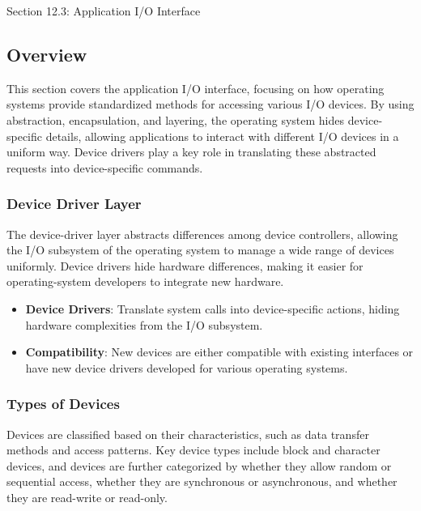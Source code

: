 \begin{notes}{Section 12.3: Application I/O Interface}
    \subsection*{Overview}

    This section covers the application I/O interface, focusing on how operating systems provide standardized methods for accessing various I/O devices. By using abstraction, encapsulation, and layering, 
    the operating system hides device-specific details, allowing applications to interact with different I/O devices in a uniform way. Device drivers play a key role in translating these abstracted 
    requests into device-specific commands.
    
    \subsubsection*{Device Driver Layer}
    
    The device-driver layer abstracts differences among device controllers, allowing the I/O subsystem of the operating system to manage a wide range of devices uniformly. Device drivers hide hardware 
    differences, making it easier for operating-system developers to integrate new hardware.
    
    \begin{highlight}
    
        \begin{itemize}
            \item \textbf{Device Drivers}: Translate system calls into device-specific actions, hiding hardware complexities from the I/O subsystem.
            \item \textbf{Compatibility}: New devices are either compatible with existing interfaces or have new device drivers developed for various operating systems.
        \end{itemize}
    
    \end{highlight}
    
    \subsubsection*{Types of Devices}
    
    Devices are classified based on their characteristics, such as data transfer methods and access patterns. Key device types include block and character devices, and devices are further categorized 
    by whether they allow random or sequential access, whether they are synchronous or asynchronous, and whether they are read-write or read-only.
    

\end{notes}
